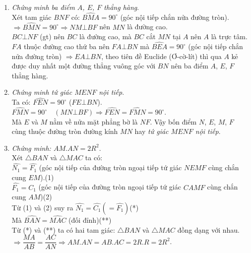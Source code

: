 \begin{vd}
{\begin{center}
		\end{center}
		\begin{enumerate}
			\item \textit{Chứng minh ba điểm $A$, $E$, $F$ thẳng hàng}.\\
			Xét tam giác $BNF$ có: $\widehat{BMA}=90^{\circ}$ (góc nội tiếp chắn nửa đường tròn).\\
			$\Rightarrow \widehat{BMN}=90^{\circ}\Rightarrow NM\bot BF$ nên $MN$ là đường cao.\\
			$BC\bot NF$ (gt) nên $BC$ là đường cao, mà $BC$ cắt $MN$ tại $A$ nên $A$ là trực tâm. $FA$ thuộc đường cao thứ ba nên $FA\bot BN$ mà $\widehat{BEA}=90^{\circ}$ (góc nội tiếp chắn nửa đường tròn) $\Rightarrow EA\bot BN$, theo tiên đề Euclide (Ơ-cờ-lít) thì qua $A$ kẻ được duy nhất một đường thẳng vuông góc với $BN$ nên ba điểm $A$, $E$, $F$ thẳng hàng.
			\item[] \textit{Chứng minh tứ giác $MENF$ nội tiếp}.\\
			Ta có: $\widehat{FEN}=90^{\circ}$ ($FE\bot BN$).\\
			$\widehat{FMN}=90^{\circ}\quad(MN\bot BF)\Rightarrow \widehat{FEN}=\widehat{FMN}=90^{\circ}$.\\
			Mà $E$ và $M$ nằm về nửa mặt phẳng bờ là $NF$. Vậy bốn điểm $N$, $E$, $M$, $F$ cùng thuộc đường tròn đường kính $MN$ hay \textit{tứ giác $MENF$ nội tiếp}.
			\item \textit{Chứng minh: $AM.AN=2R^2$}.\\
			Xét $\triangle BAN$ và $\triangle MAC$ ta có:\\
			$\widehat{N_1}=\widehat{F_1}$ (góc nội tiếp của đường tròn ngoại tiếp tứ giác $NEMF$ cùng chắn cung $EM$).\quad (1)\\
			$\widehat{F_1}=\widehat{C_1}$ (góc nội tiếp của đường tròn ngoại tiếp tứ giác $CAMF$ cùng chắn cung $AM$)\quad(2)\\
			Từ (1) và (2) suy ra $\widehat{N_1}=\widehat{C_1}(=\widehat{F_1})$\quad(*)\\
			Mà $\widehat{BAN}=\widehat{MAC}$ (đối đỉnh)\quad(**)\\
			Từ (*) và (**) ta có hai tam giác: $\triangle BAN$ và $\triangle MAC$ đồng dạng với nhau.\\
			$\Rightarrow \dfrac{MA}{AB}=\dfrac{AC}{AN}\Rightarrow AM.AN=AB.AC=2R.R=2R^2$.

\end{enumerate}}
\end{vd}
